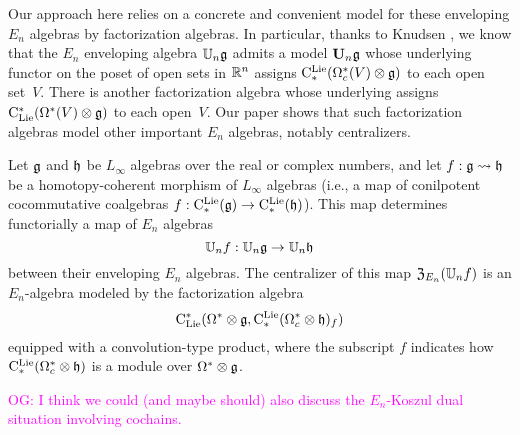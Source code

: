 \documentclass[11pt]{amsart}
\numberwithin{equation}{section}
\def\owen{\textcolor{magenta}{OG: }\textcolor{magenta}}
\begin{document}
Our approach here relies on a concrete and convenient model for these enveloping $E_n$ algebras by factorization algebras.
In particular, thanks to Knudsen \cite{Knudsen}, 
we know that the $E_n$ enveloping algebra $\mathbb U_n \mathfrak g$ admits a model $\mathbf U_n \mathfrak g$ whose underlying functor on the poset of open sets in $\mathbb R^n$ assigns ${\rm C}^{\rm Lie}_*(\Omega_c^*(V) \otimes \mathfrak g)$ to each open set~$V$.
There is another factorization algebra whose underlying assigns ${\rm C}_{\rm Lie}^*(\Omega^*(V) \otimes \mathfrak g)$ to each open~$V$.
Our paper shows that such factorization algebras model other important $E_n$ algebras, notably centralizers.

\begin{thm}
\label{thm: centralizer}
Let $\mathfrak g$ and $\mathfrak h$ be $L_\infty$ algebras over the real or complex numbers, 
and let $f: \mathfrak g \rightsquigarrow \mathfrak h$ be a homotopy-coherent morphism of $L_\infty$ algebras
(i.e., a map of conilpotent cocommutative coalgebras $f: {\rm C}^{\rm Lie}_*(\mathfrak g) \to {\rm C}^{\rm Lie}_*(\mathfrak h)$).
This map determines functorially a map of $E_n$ algebras
\[
\mathbb U_n f: \mathbb U_n \mathfrak g \to \mathbb U_n \mathfrak h
\]
between their enveloping $E_n$ algebras.
The centralizer of this map ${\frak Z}_{E_n}(\mathbb U_n f)$ is an $E_n$-algebra modeled by the factorization algebra 
\[
{\rm C}_{\rm Lie}^*(\Omega^* \otimes \mathfrak g, {\rm C}^{\rm Lie}_*(\Omega^*_c \otimes \mathfrak h)_f)
\]
equipped with a convolution-type product,
where the subscript $f$ indicates how ${\rm C}^{\rm Lie}_*(\Omega^*_c \otimes \mathfrak h)$ is a module over $\Omega^* \otimes \mathfrak g$.
\end{thm}

\owen{I think we could (and maybe should) also discuss the $E_n$-Koszul dual situation involving cochains.}

\def\Disk{{\rm Disk}}
\end{document}
